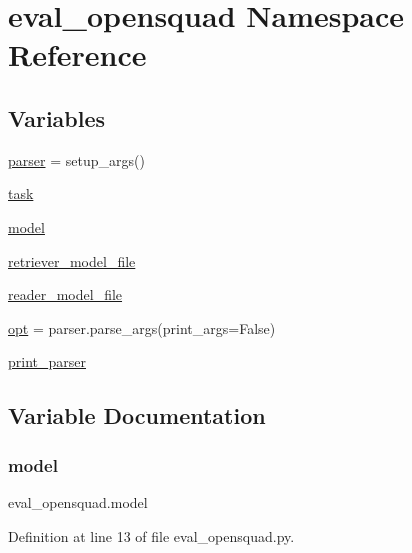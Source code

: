 \hypertarget{namespaceeval__opensquad}{}\section{eval\+\_\+opensquad Namespace Reference}
\label{namespaceeval__opensquad}
\subsection*{Variables}
\begin{DoxyCompactItemize}
\item 
\hyperlink{namespaceeval__opensquad_a6e6aca338b882527d4c737ef714911c8}{parser} = setup\+\_\+args()
\item 
\hyperlink{namespaceeval__opensquad_a9690deec3ddf1fe5126cbd9fa8147cc7}{task}
\item 
\hyperlink{namespaceeval__opensquad_aba1da993fb4784fdd106ad6c82a492e1}{model}
\item 
\hyperlink{namespaceeval__opensquad_a1b91b7e4d8f5530980d01ab7e334d669}{retriever\+\_\+model\+\_\+file}
\item 
\hyperlink{namespaceeval__opensquad_adaf15da7d218c210b5259d1b5b7257e9}{reader\+\_\+model\+\_\+file}
\item 
\hyperlink{namespaceeval__opensquad_a5e76d3ef0b537d64e0436979de0d2c57}{opt} = parser.\+parse\+\_\+args(print\+\_\+args=False)
\item 
\hyperlink{namespaceeval__opensquad_ad118c044987fdc6945c09729e4f95140}{print\+\_\+parser}
\end{DoxyCompactItemize}


\subsection{Variable Documentation}
\mbox{\label{namespaceeval__opensquad_aba1da993fb4784fdd106ad6c82a492e1}} 
\subsubsection{\texorpdfstring{model}{model}}
{\footnotesize\ttfamily eval\+\_\+opensquad.\+model}



Definition at line 13 of file eval\+\_\+opensquad.\+py.

